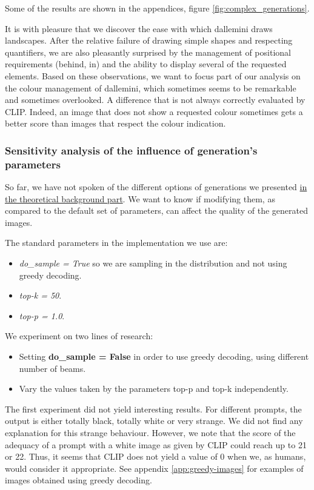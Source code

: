 \documentclass{article}
\begin{document}
\begin{multicols}{2}
Some of the results are shown in the appendices, figure \ref{fig:complex_generations}.

It is with pleasure that we discover the ease with which \gls{dallemini} draws landscapes. After the relative failure of drawing simple shapes and respecting quantifiers, we are also pleasantly surprised by the management of positional requirements (behind, in) and the ability to display several of the requested elements. Based on these observations, we want to focus part of our analysis on the colour management of \gls{dallemini}, which sometimes seems to be remarkable and sometimes overlooked. A difference that is not always correctly evaluated by CLIP. Indeed, an image that does not show a requested colour sometimes gets a better score than images that respect the colour indication.

\subsubsection{Sensitivity analysis of the influence of generation's parameters}

So far, we have not spoken of the different options of generations we presented \hyperlink{options-generation}{in the theoretical background part}. We want to know if modifying them, as compared to the default set of parameters, can affect the quality of the generated images.

The standard parameters in the implementation we use are:
\begin{itemize}
    \item \textit{do\_sample = True} so we are sampling in the distribution and not using greedy decoding.
    \item \textit{top-k = 50}.
    \item \textit{top-p = 1.0}.
\end{itemize}

We experiment on two lines of research:
\begin{itemize}
    \item Setting \textbf{do\_sample = False} in order to use greedy decoding, using different number of beams.
    \item Vary the values taken by the parameters top-p and top-k independently.
\end{itemize}

The first experiment did not yield interesting results. For different prompts, the output is either totally black, totally white or very strange. We did not find any explanation for this strange behaviour. However, we note that the score of the adequacy of a prompt with a white image as given by CLIP could reach up to 21 or 22. Thus, it seems that CLIP does not yield a value of 0 when we, as humans, would consider it appropriate. See appendix \ref{app:greedy-images} for examples of images obtained using greedy decoding. 


\end{multicols}
\end{document}
